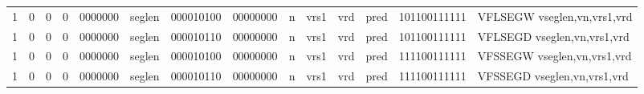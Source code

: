 \begin{landscape}
\begin{table}[p]
\begin{small}
\begin{center}
\begin{tabular}{p{0.08in}@{}p{0.08in}@{}p{0.08in}@{}p{0.08in}@{}p{0.50in}@{}p{0.30in}@{}p{0.08in}@{}p{0.8in}@{}p{0.48in}@{}p{0.32in}@{}p{0.08in}@{}p{0.8in}@{}p{0.8in}@{}p{0.4in}@{}p{0.56in}l}
\multicolumn{1}{|c|}{1} &
\multicolumn{1}{c|}{0} &
\multicolumn{1}{c|}{0} &
\multicolumn{1}{c|}{0} &
\multicolumn{1}{c|}{0000000} &
\multicolumn{1}{c|}{seglen} &
\multicolumn{2}{c|}{000010100} &
\multicolumn{2}{c|}{00000000} &
\multicolumn{1}{c|}{n} &
\multicolumn{1}{c|}{vrs1} &
\multicolumn{1}{c|}{vrd} &
\multicolumn{1}{c|}{pred} &
\multicolumn{1}{c|}{101100111111} & VFLSEGW vseglen,vn,vrs1,vrd \\
\cline{1-15}
  

\multicolumn{1}{|c|}{1} &
\multicolumn{1}{c|}{0} &
\multicolumn{1}{c|}{0} &
\multicolumn{1}{c|}{0} &
\multicolumn{1}{c|}{0000000} &
\multicolumn{1}{c|}{seglen} &
\multicolumn{2}{c|}{000010110} &
\multicolumn{2}{c|}{00000000} &
\multicolumn{1}{c|}{n} &
\multicolumn{1}{c|}{vrs1} &
\multicolumn{1}{c|}{vrd} &
\multicolumn{1}{c|}{pred} &
\multicolumn{1}{c|}{101100111111} & VFLSEGD vseglen,vn,vrs1,vrd \\
\cline{1-15}
  

\multicolumn{1}{|c|}{1} &
\multicolumn{1}{c|}{0} &
\multicolumn{1}{c|}{0} &
\multicolumn{1}{c|}{0} &
\multicolumn{1}{c|}{0000000} &
\multicolumn{1}{c|}{seglen} &
\multicolumn{2}{c|}{000010100} &
\multicolumn{2}{c|}{00000000} &
\multicolumn{1}{c|}{n} &
\multicolumn{1}{c|}{vrs1} &
\multicolumn{1}{c|}{vrd} &
\multicolumn{1}{c|}{pred} &
\multicolumn{1}{c|}{111100111111} & VFSSEGW vseglen,vn,vrs1,vrd \\
\cline{1-15}
  

\multicolumn{1}{|c|}{1} &
\multicolumn{1}{c|}{0} &
\multicolumn{1}{c|}{0} &
\multicolumn{1}{c|}{0} &
\multicolumn{1}{c|}{0000000} &
\multicolumn{1}{c|}{seglen} &
\multicolumn{2}{c|}{000010110} &
\multicolumn{2}{c|}{00000000} &
\multicolumn{1}{c|}{n} &
\multicolumn{1}{c|}{vrs1} &
\multicolumn{1}{c|}{vrd} &
\multicolumn{1}{c|}{pred} &
\multicolumn{1}{c|}{111100111111} & VFSSEGD vseglen,vn,vrs1,vrd \\
\cline{1-15}
  

\end{tabular}
\end{center}
\end{small}

\label{instr-table}
\end{table}
\end{landscape}
\restoregeometry
  

\newpage

